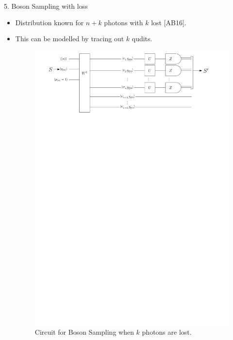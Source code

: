 \documentclass[]{templates/poster}
\begin{document}
\begin{frame}{}
\begin{columns}[t]
\begin{column}{0.422\linewidth}
  \begin{block}{\Large 5. Boson Sampling with loss}
  \begin{itemize}
  \item Distribution known for $n+k$ photons with $k$ lost [AB16].
  \item This can be modelled by tracing out $k$ qudits.
  \begin{center}
  \begin{figure}
  \includegraphics[width=0.75\linewidth]{lost_circuit}
  \caption{\label{fig:lost-circuit} Circuit for Boson Sampling when $k$ photons are lost.}
  \end{figure}
  \end{center}
  \end{itemize}
  
  \end{block}
  

\end{column}
\end{columns}
\end{frame}
\end{document}
